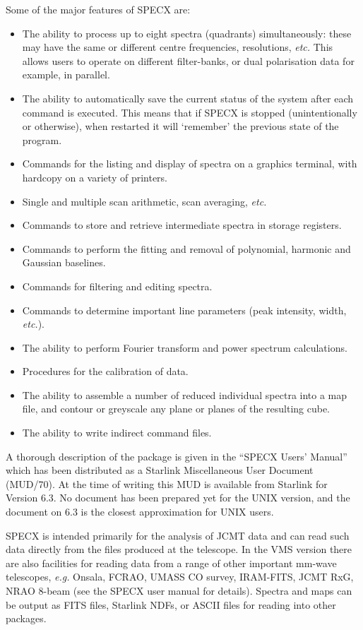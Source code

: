 \documentclass[twoside,11pt,nolof]{starlink}
\begin{document}
Some of the major features of SPECX are:
\begin{itemize}
\item
The ability to process up to eight spectra (quadrants) simultaneously:
these may have the same or different centre frequencies, resolutions,
\emph{etc.} This allows users to operate on different filter-banks, or
dual polarisation data for example, in parallel.
\item
The ability to automatically save the current status of the system
after each command is executed. This means that if SPECX is
stopped (unintentionally or otherwise), when restarted it will
`remember' the previous state of the program.
\item
Commands for the listing and display of spectra on a graphics
terminal, with hardcopy on a variety of printers.
\item
Single and multiple scan arithmetic, scan averaging, \emph{etc.}
\item
Commands to store and retrieve intermediate spectra in storage registers.
\item
Commands to perform the fitting and removal of polynomial,
harmonic and Gaussian baselines.
\item
Commands for filtering and editing spectra.
\item
Commands to determine important line parameters (peak intensity, width,
\emph{etc.}).
\item
The ability to perform Fourier transform and power spectrum calculations.
\item
Procedures for the calibration of data.
\item
The ability to assemble a number of reduced individual spectra into a
map file, and contour or greyscale any plane or planes of the resulting cube.
\item
The ability to write indirect command files.
\end{itemize}

A thorough description of the package is given in the ``SPECX Users' Manual''
which has been distributed as a Starlink Miscellaneous User Document
(MUD/70). At the time of writing this MUD is available from Starlink for
Version 6.3. No document has been prepared yet for the UNIX
version, and the document on 6.3 is the closest approximation for UNIX
users.

SPECX is intended primarily for the analysis of JCMT data and can read such
data directly from the  files produced at the telescope.  In the VMS
version there are also facilities for reading data from a range of other
important mm-wave telescopes, \emph{e.g.} Onsala, FCRAO, UMASS CO survey,
IRAM-FITS, JCMT RxG, NRAO 8-beam (see the SPECX user manual for details).
Spectra and maps can be output as FITS files, Starlink NDFs, or ASCII files
for reading into other packages.
\end{document}
